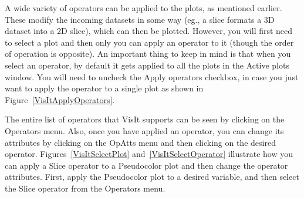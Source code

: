 A wide variety of operators can be applied to the plots, as mentioned
earlier. These modify the incoming datasets in some way (eg., a slice
formats a 3D dataset into a 2D slice), which can then be
plotted. However, you will first need to select a plot and then only
you can apply an operator to it (though the order of operation is
opposite). An important thing to keep in mind is that when you select
an operator, by default it gets applied to all the plots in the Active
plots window. You will need to uncheck the Apply operators checkbox,
in case you just want to apply the operator to a single plot as shown
in Figure~\ref{VisItApplyOperators}.


The entire list of operators that VisIt supports can be seen by
clicking on the Operators menu. Also, once you have applied an
operator, you can change its attributes by clicking on the OpAtts menu
and then clicking on the desired operator.
Figures~\ref{VisItSelectPlot} and~\ref{VisItSelectOperator} illustrate
how you can apply a Slice operator to a Pseudocolor plot and then
change the operator attributes.  First, apply the Pseudocolor plot to
a desired variable, and then select the Slice operator from the
Operators menu.





\begin{figure}
  \vspace{-100pt}
  \centering
  \hspace{50pts}
  \caption{}
  \label{}
\end{figure}


